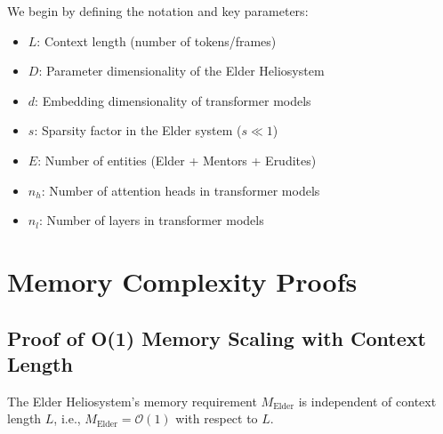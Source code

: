We begin by defining the notation and key parameters:
\begin{itemize}
    \item $L$: Context length (number of tokens/frames)
    \item $D$: Parameter dimensionality of the Elder Heliosystem
    \item $d$: Embedding dimensionality of transformer models
    \item $s$: Sparsity factor in the Elder system ($s \ll 1$)
    \item $E$: Number of entities (Elder + Mentors + Erudites)
    \item $n_h$: Number of attention heads in transformer models
    \item $n_l$: Number of layers in transformer models
\end{itemize}

\section{Memory Complexity Proofs}

\subsection{Proof of O(1) Memory Scaling with Context Length}

\begin{theorem}
The Elder Heliosystem's memory requirement $M_{\text{Elder}}$ is independent of context length $L$, i.e., $M_{\text{Elder}} = \mathcal{O}(1)$ with respect to $L$.
\end{theorem}

